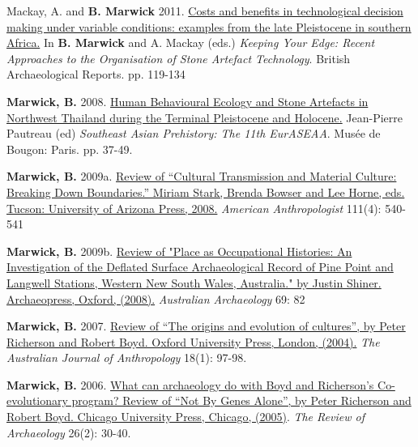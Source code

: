 \documentclass[11pt,article,oneside]{memoir}
\begin{document}
\ind Mackay, A. and \textbf{B. Marwick} 2011. \href{http://faculty.washington.edu/bmarwick/PDFs/Mackay_and_Marwick_2011_timecost.pdf}{Costs and benefits in technological decision making under variable conditions: examples from the late Pleistocene in southern Africa.} In \textbf{B. Marwick} and A. Mackay (eds.) \textit{Keeping Your Edge: Recent Approaches to the Organisation of Stone Artefact Technology}. British Archaeological Reports.  pp. 119-134 

\ind \textbf{Marwick, B.} 2008. \href{http://faculty.washington.edu/bmarwick/PDFs/Marwick_2008_EurASEAA.pdf}{Human Behavioural Ecology and Stone Artefacts in Northwest Thailand during the Terminal Pleistocene and Holocene.} Jean-Pierre Pautreau (ed) \textit{Southeast Asian Prehistory: The 11th EurASEAA}. Musée de Bougon: Paris. pp. 37-49. 

\bigskip


\ind \textbf{Marwick, B.} 2009a. \href{http://faculty.washington.edu/bmarwick/PDFs/Marwick_2009_AA_Stark_Review.pdf}{Review of “Cultural Transmission and Material Culture: Breaking Down Boundaries.” Miriam Stark, Brenda Bowser and Lee Horne, eds. Tucson: University of Arizona Press, 2008.} \textit{American Anthropologist} 111(4): 540-541

\ind \textbf{Marwick, B.} 2009b. \href{http://faculty.washington.edu/bmarwick/PDFs/Marwick_2009_Shiner_review.pdf}{Review of "Place as Occupational Histories: An Investigation of the Deflated Surface Archaeological Record of Pine Point and Langwell Stations, Western New South Wales, Australia." by Justin Shiner. Archaeopress, Oxford, (2008).} \textit{Australian Archaeology} 69: 82

\ind \textbf{Marwick, B.} 2007. \href{http://faculty.washington.edu/bmarwick/PDFs/Evolution.pdf}{Review of “The origins and evolution of cultures”, by Peter Richerson and Robert Boyd. Oxford University Press, London, (2004).} \textit{The Australian Journal of Anthropology} 18(1): 97-98.

\ind \textbf{Marwick, B.} 2006. \href{http://faculty.washington.edu/bmarwick/PDFs/Marwick_2006_[B&R].pdf}{What can archaeology do with Boyd and Richerson’s Co-evolutionary program? Review of “Not By Genes Alone”, by Peter Richerson and Robert Boyd. Chicago University Press, Chicago, (2005)}. \textit{The Review of Archaeology} 26(2): 30-40.
\end{document}
